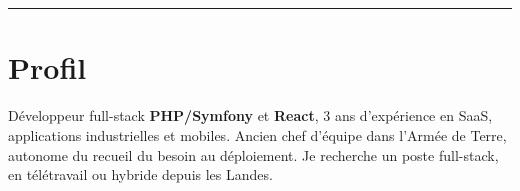 {\LARGE\bfseries\color{maincolor}\myname}\;{\large\color{secondcolor}\mytitle}\\[4pt]
{\small\color{detailcolor}
  \textcolor{maincolor}{}~\myaddress
  \cvsep
  \textcolor{maincolor}{}~\myphone
  \cvsep
  \textcolor{maincolor}{}~\href{mailto:\myemail}{\myemail}
  \cvsep
  \textcolor{maincolor}{}~\href{\mylinkedinurl}{\mylinkedinname}
  \cvsep
  \textcolor{maincolor}{}~\href{\mygithuburl}{\mygithubname}
}

\vspace{2pt}
{\color{maincolor}\rule{\linewidth}{1.2pt}}

\section*{ Profil}
Développeur full-stack \textbf{\color{maincolor}PHP/Symfony} et \textbf{\color{maincolor}React}, 3 ans d'expérience en SaaS, applications industrielles et mobiles.
Ancien chef d'équipe dans l'Armée de Terre, autonome du recueil du besoin au déploiement.
Je recherche un poste full-stack, en télétravail ou hybride depuis les Landes.
